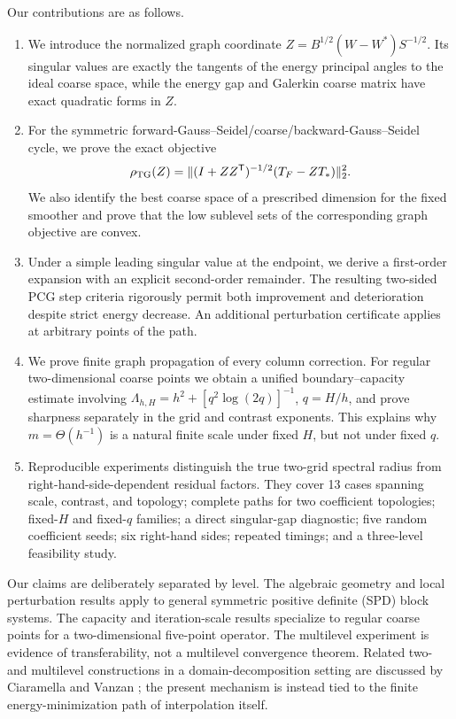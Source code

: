 \documentclass[smallextended]{svjour3}
\newcommand{\T}{\mathsf{T}}
\newcommand{\norm}[1]{\lVert#1\rVert}
\begin{document}
Our contributions are as follows.
\begin{enumerate}
\item We introduce the normalized graph coordinate $Z=B^{1/2}(W-W^*)S^{-1/2}$. Its singular values are exactly the tangents of the energy principal angles to the ideal coarse space, while the energy gap and Galerkin coarse matrix have exact quadratic forms in $Z$.
\item For the symmetric forward-Gauss--Seidel/coarse/backward-Gauss--Seidel cycle, we prove the exact objective
\begin{equation*}
 \rho_{\rm TG}(Z)=\norm{(I+ZZ^\T)^{-1/2}(T_F-ZT_*)}_2^2.
\end{equation*}
We also identify the best coarse space of a prescribed dimension for the fixed smoother and prove that the low sublevel sets of the corresponding graph objective are convex.
\item Under a simple leading singular value at the endpoint, we derive a first-order expansion with an explicit second-order remainder. The resulting two-sided PCG step criteria rigorously permit both improvement and deterioration despite strict energy decrease. An additional perturbation certificate applies at arbitrary points of the path.
\item We prove finite graph propagation of every column correction. For regular two-dimensional coarse points we obtain a unified boundary--capacity estimate involving
$\Lambda_{h,H}=h^2+[q^2\log(2q)]^{-1}$, $q=H/h$, and prove sharpness separately in the grid and contrast exponents. This explains why $m=\Theta(h^{-1})$ is a natural finite scale under fixed $H$, but not under fixed $q$.
\item Reproducible experiments distinguish the true two-grid spectral radius from right-hand-side-dependent residual factors. They cover 13 cases spanning scale, contrast, and topology; complete paths for two coefficient topologies; fixed-$H$ and fixed-$q$ families; a direct singular-gap diagnostic; five random coefficient seeds; six right-hand sides; repeated timings; and a three-level feasibility study.
\end{enumerate}

Our claims are deliberately separated by level. The algebraic geometry and local perturbation results apply to general symmetric positive definite (SPD) block systems. The capacity and iteration-scale results specialize to regular coarse points for a two-dimensional five-point operator. The multilevel experiment is evidence of transferability, not a multilevel convergence theorem. Related two- and multilevel constructions in a domain-decomposition setting are discussed by Ciaramella and Vanzan \cite{ciaramella2022substructured}; the present mechanism is instead tied to the finite energy-minimization path of interpolation itself.
\end{document}
